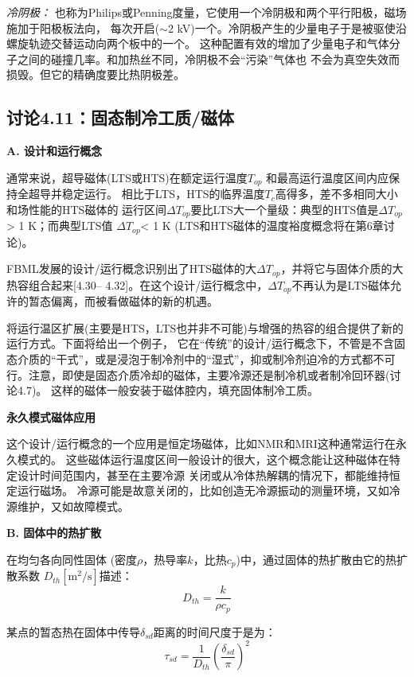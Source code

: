 \textit{冷阴极：} 也称为Philips或Penning度量，它使用一个冷阴极和两个平行阳极，磁场施加于阳极板法向，
每次开启($\sim 2$ kV)一个。冷阴极产生的少量电子于是被驱使沿螺旋轨迹交替运动向两个板中的一个。
这种配置有效的增加了少量电子和气体分子之间的碰撞几率。和加热丝不同，冷阴极不会“污染”气体也
不会为真空失效而损毁。但它的精确度要比热阴极差。

\subsection{讨论4.11：固态制冷工质/磁体}
\textbf{A. 设计和运行概念}

通常来说，超导磁体(LTS或HTS)在额定运行温度$T_{op}$ 和最高运行温度区间内应保持全超导并稳定运行。
相比于LTS，HTS的临界温度$T_c$高得多，差不多相同大小和场性能的HTS磁体的
运行区间$\Delta T_{op}$要比LTS大一个量级：典型的HTS值是$\Delta T_{op}$ > 1 K；而典型LTS值
$\Delta T_{op}$< 1 K (LTS和HTS磁体的温度裕度概念将在第6章讨论)。

FBML发展的设计/运行概念识别出了HTS磁体的大$\Delta T_{op}$，并将它与固体介质的大热容组合起来[4.30–
4.32]。在这个设计/运行概念中，$\Delta T_{op}$不再认为是LTS磁体允许的暂态偏离，而被看做磁体的新的机遇。

将运行温区扩展(主要是HTS，LTS也并非不可能)与增强的热容的组合提供了新的运行方式。下面将给出一个例子，
它在“传统”的设计/运行概念下，不管是不含固态介质的“干式”，或是浸泡于制冷剂中的“湿式”，抑或制冷剂迫冷的方式都不可行。注意，即使是固态介质冷却的磁体，主要冷源还是制冷机或者制冷回环器(讨论4.7)。
这样的磁体一般安装于磁体腔内，填充固体制冷工质。

\textbf{永久模式磁体应用}

这个设计/运行概念的一个应用是恒定场磁体，比如NMR和MRI这种通常运行在永久模式的。
这些磁体运行温度区间一般设计的很大，这个概念能让这种磁体在特定设计时间范围内，甚至在主要冷源
关闭或从冷体热解耦的情况下，都能维持恒定运行磁场。
冷源可能是故意关闭的，比如创造无冷源振动的测量环境，又如冷源维护，又如故障模式。

\textbf{B. 固体中的热扩散}

在均匀各向同性固体 (密度$\rho$，热导率$k$，比热$c_p$)中，通过固体的热扩散由它的热扩散系数 $D_{th}[\mathrm{m^2/s}]$描述：
\begin{equation}%
D_{th}=\frac{k}{\rho c_p}
\end{equation}

某点的暂态热在固体中传导$\delta_{sd}$距离的时间尺度于是为：
\begin{equation}%
\tau_{sd}=\frac{1}{D_{th}}(\frac{\delta_{sd}}{\pi})^2
\end{equation}

